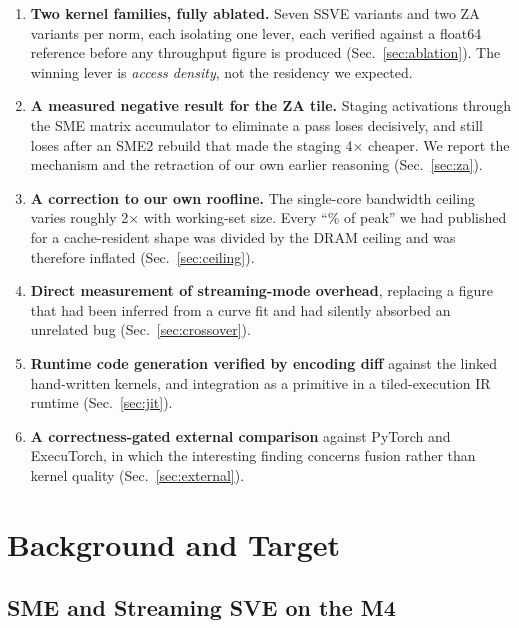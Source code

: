 \documentclass[conference,10pt]{IEEEtran}
\begin{document}
\begin{enumerate}
\item \textbf{Two kernel families, fully ablated.} Seven SSVE variants and two
ZA variants per norm, each isolating one lever, each verified against a float64
reference before any throughput figure is produced (Sec.~\ref{sec:ablation}).
The winning lever is \emph{access density}, not the residency we expected.

\item \textbf{A measured negative result for the ZA tile.} Staging activations
through the SME matrix accumulator to eliminate a pass loses decisively, and
still loses after an SME2 rebuild that made the staging 4$\times$ cheaper. We
report the mechanism and the retraction of our own earlier reasoning
(Sec.~\ref{sec:za}).

\item \textbf{A correction to our own roofline.} The single-core bandwidth
ceiling varies roughly 2$\times$ with working-set size. Every ``\% of peak'' we
had published for a cache-resident shape was divided by the DRAM ceiling and was
therefore inflated (Sec.~\ref{sec:ceiling}).

\item \textbf{Direct measurement of streaming-mode overhead}, replacing a figure
that had been inferred from a curve fit and had silently absorbed an unrelated
bug (Sec.~\ref{sec:crossover}).

\item \textbf{Runtime code generation verified by encoding diff} against the
linked hand-written kernels, and integration as a primitive in a tiled-execution
IR runtime (Sec.~\ref{sec:jit}).

\item \textbf{A correctness-gated external comparison} against PyTorch and
ExecuTorch, in which the interesting finding concerns fusion rather than kernel
quality (Sec.~\ref{sec:external}).
\end{enumerate}

\section{Background and Target}

\subsection{SME and Streaming SVE on the M4}
\end{document}

